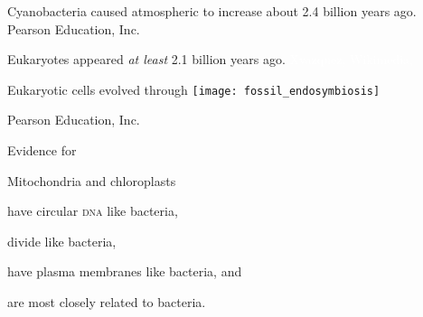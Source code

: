 \documentclass[t]{beamer}
\begin{document}
{
\begin{frame}[b]{Cyanobacteria caused atmospheric  to increase about 2.4 billion years ago.}
\tiny \textcopyright Pearson Education, Inc.
\end{frame}
}
%
{
\begin{frame}[b]{Eukaryotes appeared \emph{at least} 2.1 billion years ago.}
\tiny \textcolor{white}{Xvazquez, Wikimedia, }
\end{frame}
}
%
\begin{frame}[t]{Eukaryotic cells evolved through }
	\texttt{[image: fossil\_endosymbiosis]}
	
	\vfilll
	
	\hfill \tiny \textcopyright Pearson Education, Inc.
\end{frame}
%
{
\begin{frame}

\end{frame}
}
%
\begin{frame}[t]{Evidence for  }

	\hangpara Mitochondria and chloroplasts
	
	\hangpara \hspace*{1em} have circular \textsc{dna} like bacteria,
	
	\hangpara \hspace*{1em} divide like bacteria,
	
	\hangpara \hspace*{1em} have plasma membranes like bacteria, and
	
	\hangpara \hspace*{1em} are most closely related to bacteria.
	
\end{frame}
\end{document}
